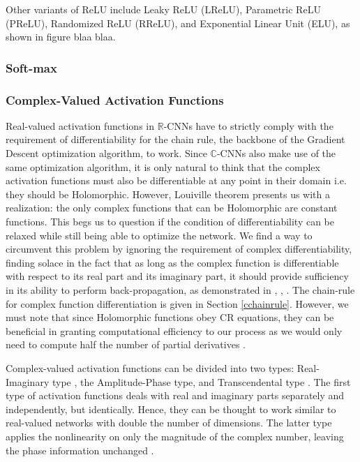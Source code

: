  
 Other variants of ReLU include Leaky ReLU (LReLU), Parametric ReLU (PReLU), Randomized ReLU (RReLU), and Exponential Linear Unit (ELU), as shown in figure blaa blaa. 
  
 \subsubsection{Soft-max}
  
 \subsubsection{Complex-Valued Activation Functions}\label{cvaf}
 
 Real-valued activation functions in $\mathbb{R}$-CNNs have to strictly comply with the requirement of differentiability for the chain rule, the backbone of the Gradient Descent optimization algorithm, to work. Since $\mathbb{C}$-CNNs also make use of the 
 same optimization algorithm, it is only natural to think that the complex activation functions must also be differentiable at any point in their domain i.e. they should be Holomorphic. However, Louiville theorem presents us with a realization: the only complex functions that can be  Holomorphic are constant functions. This begs us to question if the condition of differentiability can be relaxed while still being able to optimize the network.
 We find a way to circumvent this problem by ignoring the requirement of complex differentiability, finding solace in the fact that as long as the complex function is differentiable with respect to its real part and its imaginary part, it should provide sufficiency in its ability to perform back-propagation, as demonstrated in \cite{trabelsi2018deep}, \cite{hansch2010complex}, \cite{polsarzhang2017complex}. The chain-rule for complex function differentiation is given in Section \ref{cchainrule}. However, we must note that since Holomorphic functions obey CR equations, they can be  beneficial in granting computational efficiency to our process as we would only need to compute half the number of partial derivatives \cite{sarroff2015learning}.
 
     
 Complex-valued activation functions can be divided into two types: Real-Imaginary type , the Amplitude-Phase type, and Transcendental type \cite{}.
 The first type of activation functions deals with real and imaginary parts separately and independently, but identically. Hence, they can be thought to work similar to real-valued networks with double the number of dimensions.  The latter type applies the nonlinearity on only the magnitude of the complex number, leaving the phase information unchanged \cite{page45hirose2012complex} . 
 
